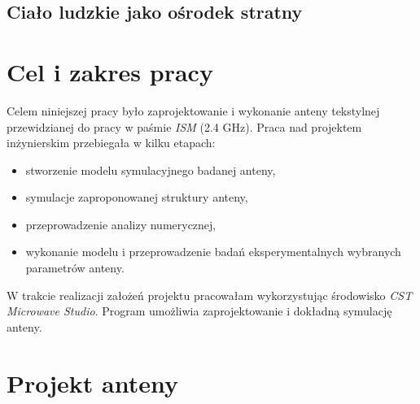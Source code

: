 \section{Ciało ludzkie jako ośrodek stratny}












 \chapter{Cel i zakres pracy}

Celem niniejszej pracy było zaprojektowanie i wykonanie anteny tekstylnej przewidzianej do pracy w paśmie \emph{ISM} (2.4 GHz). 
Praca nad projektem inżynierskim przebiegała w kilku etapach:

\begin{itemize}\setlength{\itemsep}{0pt}
	
	\item stworzenie modelu symulacyjnego badanej anteny,

	\item symulacje zaproponowanej struktury anteny,

	\item przeprowadzenie analizy numerycznej,

	\item wykonanie modelu i przeprowadzenie badań eksperymentalnych wybranych parametrów anteny.

\end{itemize}

W trakcie realizacji założeń projektu pracowałam wykorzystując środowisko \emph{CST Microwave Studio}. Program umożliwia zaprojektowanie i dokładną symulację anteny.   



\chapter {Projekt anteny}



